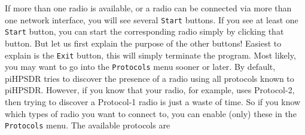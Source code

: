 \documentclass[12pt]{book}
\def\rett#1{\texttt{\color{red}#1}}
\def\pH{pi\-HPSDR\xspace}
\begin{document}
If more than one radio is available, or a radio can be connected via more than one network interface,
you will see several \rett{Start} buttons.
If you see at least one \rett{Start} button, you can start the corresponding radio simply
by clicking that button. But let us first explain the
purpose of the other buttons! Easiest to explain is the \rett{Exit} button, this will simply terminate
the program. Most likely, you may want to go into the \rett{Protocols} menu sooner or later.
By default, \pH tries to discover the presence of a radio using all protocols known to \pH. However,
if you know that your radio, for example, uses Protocol-2, then trying to discover a Protocol-1
radio is just a waste of time. So if you know which types of radio you want to connect to, you can enable
(only) these in the \rett{Protocols} menu. The available protocols are
\end{document}
